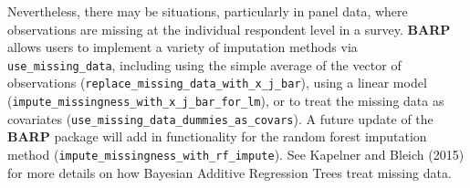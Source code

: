 \documentclass[]{article}
\newenvironment{Shaded}{\begin{snugshade}}{\end{snugshade}}
\newcommand{\KeywordTok}[1]{\textcolor[rgb]{0.13,0.29,0.53}{\textbf{#1}}}
\newcommand{\DataTypeTok}[1]{\textcolor[rgb]{0.13,0.29,0.53}{#1}}
\newcommand{\DecValTok}[1]{\textcolor[rgb]{0.00,0.00,0.81}{#1}}
\newcommand{\StringTok}[1]{\textcolor[rgb]{0.31,0.60,0.02}{#1}}
\newcommand{\OtherTok}[1]{\textcolor[rgb]{0.56,0.35,0.01}{#1}}
\newcommand{\OperatorTok}[1]{\textcolor[rgb]{0.81,0.36,0.00}{\textbf{#1}}}
\newcommand{\NormalTok}[1]{#1}
\begin{document}
Nevertheless, there may be situations, particularly in panel data, where
observations are missing at the individual respondent level in a survey.
\textbf{BARP} allows users to implement a variety of imputation methods
via \texttt{use\_missing\_data}, including using the simple average of
the vector of observations
(\texttt{replace\_missing\_data\_with\_x\_j\_bar}), using a linear model
(\texttt{impute\_missingness\_with\_x\_j\_bar\_for\_lm}), or to treat
the missing data as covariates
(\texttt{use\_missing\_data\_dummies\_as\_covars}). A future update of
the \textbf{BARP} package will add in functionality for the random
forest imputation method
(\texttt{impute\_missingness\_with\_rf\_impute}). See Kapelner and
Bleich (2015) for more details on how Bayesian Additive Regression Trees
treat missing data.

\begin{Shaded}
\end{Shaded}
\end{document}
